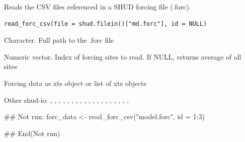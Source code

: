 \documentclass[a4paper]{book}
\begin{document}
%
\begin{Description}\relax
Reads the CSV files referenced in a SHUD forcing file (.forc).
\end{Description}
%
\begin{Usage}
\begin{verbatim}
read_forc_csv(file = shud.filein()["md.forc"], id = NULL)
\end{verbatim}
\end{Usage}
%
\begin{Arguments}
\begin{ldescription}
\item[\code{file}] Character. Full path to the .forc file

\item[\code{id}] Numeric vector. Index of forcing sites to read. If NULL, returns average of all sites
\end{ldescription}
\end{Arguments}
%
\begin{Value}
Forcing data as xts object or list of xts objects
\end{Value}
%
\begin{SeeAlso}\relax
Other shud-io: 
,
,
,
,
,
,
,
,
,
,
,
,
,
,
,
,
,
,
,
\end{SeeAlso}
%
\begin{Examples}
\begin{ExampleCode}
## Not run: 
forc_data <- read_forc_csv("model.forc", id = 1:3)

## End(Not run)
\end{ExampleCode}
\end{Examples}
\end{document}
